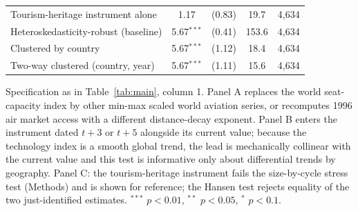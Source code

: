 \documentclass[12pt]{article}
\begin{document}
\begin{table}[htbp]
\begin{threeparttable}
\begin{tabular}{lcccc}
  Tourism-heritage instrument alone & 1.17 & (0.83) & 19.7 & 4,634 \\
  Heteroskedasticity-robust (baseline) & 5.67$^{***}$ & (0.41) & 153.6 & 4,634 \\
  Clustered by country & 5.67$^{***}$ & (1.12) & 18.4 & 4,634 \\
  Two-way clustered (country, year) & 5.67$^{***}$ & (1.11) & 15.6 & 4,634 \\
\bottomrule
\end{tabular}
\begin{tablenotes}\scriptsize
\item Specification as in Table~\ref{tab:main}, column 1. Panel A replaces the world seat-capacity index by other min-max scaled world aviation series, or recomputes 1996 air market access with a different distance-decay exponent. Panel B enters the instrument dated $t+3$ or $t+5$ alongside its current value; because the technology index is a smooth global trend, the lead is mechanically collinear with the current value and this test is informative only about differential trends by geography. Panel C: the tourism-heritage instrument fails the size-by-cycle stress test (Methods) and is shown for reference; the Hansen test rejects equality of the two just-identified estimates. $^{***}$ $p<0.01$, $^{**}$ $p<0.05$, $^{*}$ $p<0.1$.
\end{tablenotes}
\end{threeparttable}
\end{table}
\end{document}
